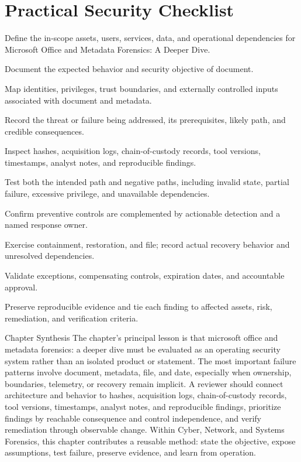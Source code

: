 \documentclass[11pt,letterpaper]{article}
\begin{document}
\section*{Practical Security Checklist}
\begin{CornellChecklist}
\item Define the in-scope assets, users, services, data, and operational dependencies for Microsoft Office and Metadata Forensics: A Deeper Dive.
\item Document the expected behavior and security objective of document.
\item Map identities, privileges, trust boundaries, and externally controlled inputs associated with document and metadata.
\item Record the threat or failure being addressed, its prerequisites, likely path, and credible consequences.
\item Inspect hashes, acquisition logs, chain-of-custody records, tool versions, timestamps, analyst notes, and reproducible findings.
\item Test both the intended path and negative paths, including invalid state, partial failure, excessive privilege, and unavailable dependencies.
\item Confirm preventive controls are complemented by actionable detection and a named response owner.
\item Exercise containment, restoration, and file; record actual recovery behavior and unresolved dependencies.
\item Validate exceptions, compensating controls, expiration dates, and accountable approval.
\item Preserve reproducible evidence and tie each finding to affected assets, risk, remediation, and verification criteria.
\end{CornellChecklist}
\begin{CornellSummaryBox}{Chapter Synthesis}
The chapter's principal lesson is that microsoft office and metadata forensics: a deeper dive must be evaluated as an operating security system rather than an isolated product or statement. The most important failure patterns involve document, metadata, file, and date, especially when ownership, boundaries, telemetry, or recovery remain implicit. A reviewer should connect architecture and behavior to hashes, acquisition logs, chain-of-custody records, tool versions, timestamps, analyst notes, and reproducible findings, prioritize findings by reachable consequence and control independence, and verify remediation through observable change. Within Cyber, Network, and Systems Forensics, this chapter contributes a reusable method: state the objective, expose assumptions, test failure, preserve evidence, and learn from operation.
\end{CornellSummaryBox}
\end{document}
